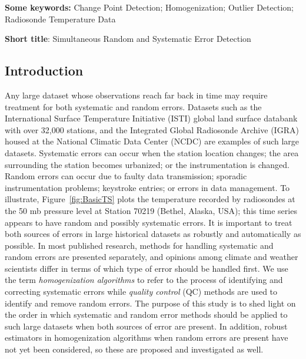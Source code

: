 \documentclass[12pt]{article}
\begin{document}
\begin{singlespacing}
\par\vfill\noindent
{\bf Some keywords:} Change Point Detection; Homogenization; Outlier Detection; Radiosonde Temperature Data

\par\medskip\noindent
{\bf Short title}:  Simultaneous Random and Systematic Error Detection

\end{singlespacing}
\clearpage\pagebreak\newpage {}
\begin{doublespacing}


\section{Introduction}


Any large dataset whose observations reach far back in time may require treatment for both systematic and random errors. Datasets such as the International Surface Temperature Initiative (ISTI) global land surface databank \cite{rennie14} with over 32,000 stations, and the Integrated Global Radiosonde Archive (IGRA) housed at the National Climatic Data Center (NCDC) \cite{durre06} are examples of such large datasets. Systematic errors can occur when the station location changes; the area surrounding the station becomes urbanized; or the instrumentation is changed. Random errors can occur due to faulty data transmission; sporadic instrumentation problems; keystroke entries; or errors in data management. To illustrate, Figure~\ref{fig:BasicTS} plots the temperature recorded by radiosondes at the 50 mb pressure level at Station 70219 (Bethel, Alaska, USA); this time series appears to have random and possibly systematic errors.  It is important to treat both sources of errors in  large historical datasets as robustly and automatically as possible. In most published research, methods for handling systematic and random errors are presented separately, and opinions among climate and weather scientists differ in terms of which type of error should be handled first.  We use the term \emph{homogenization algorithms} to refer to the process of identifying and correcting systematic errors while \emph{quality control} (QC) methods are used to identify and remove random errors.   The purpose of this study is to shed light on the order in which systematic and random error methods should be applied to such large datasets when  both sources of error are present. In addition, robust estimators in homogenization algorithms when random errors are present have not yet been considered, so these are proposed and investigated as well.


\end{doublespacing}
\end{document}
